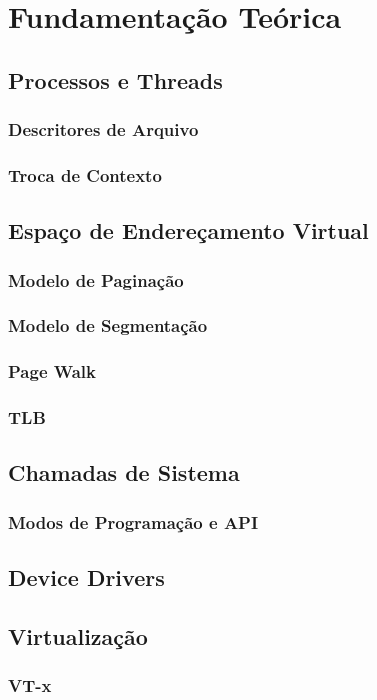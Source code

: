 \chapter{Fundamentação Teórica}
\label{cap:fundamentacao-teorica}

\section{Processos e Threads}

\subsection{Descritores de Arquivo}

\subsection{Troca de Contexto}

\section{Espaço de Endereçamento Virtual}

\subsection{Modelo de Paginação}

\subsection{Modelo de Segmentação}

\subsection{Page Walk}

\subsection{TLB}

\section{Chamadas de Sistema}

\subsection{Modos de Programação e API}

\section{Device Drivers}
\label{sec:dd}

\section{Virtualização}

\subsection{VT-x}

